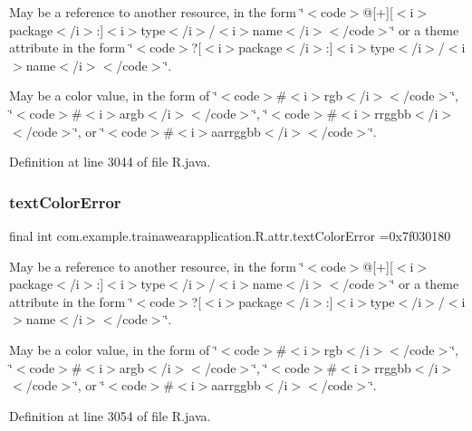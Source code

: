 May be a reference to another resource, in the form \char`\"{}$<$code$>$@\mbox{[}+\mbox{]}\mbox{[}$<$i$>$package$<$/i$>$\+:\mbox{]}$<$i$>$type$<$/i$>$/$<$i$>$name$<$/i$>$$<$/code$>$\char`\"{} or a theme attribute in the form \char`\"{}$<$code$>$?\mbox{[}$<$i$>$package$<$/i$>$\+:\mbox{]}$<$i$>$type$<$/i$>$/$<$i$>$name$<$/i$>$$<$/code$>$\char`\"{}. 

May be a color value, in the form of \char`\"{}$<$code$>$\#$<$i$>$rgb$<$/i$>$$<$/code$>$\char`\"{}, \char`\"{}$<$code$>$\#$<$i$>$argb$<$/i$>$$<$/code$>$\char`\"{}, \char`\"{}$<$code$>$\#$<$i$>$rrggbb$<$/i$>$$<$/code$>$\char`\"{}, or \char`\"{}$<$code$>$\#$<$i$>$aarrggbb$<$/i$>$$<$/code$>$\char`\"{}. 

Definition at line 3044 of file R.\+java.

\mbox{\label{classcom_1_1example_1_1trainawearapplication_1_1_r_1_1attr_a24b1ff1d1704c18bb112244e16d1278a}} 
\subsubsection{\texorpdfstring{textColorError}{textColorError}}
{\footnotesize\ttfamily final int com.\+example.\+trainawearapplication.\+R.\+attr.\+text\+Color\+Error =0x7f030180\hspace{0.3cm}{\ttfamily [static]}}

May be a reference to another resource, in the form \char`\"{}$<$code$>$@\mbox{[}+\mbox{]}\mbox{[}$<$i$>$package$<$/i$>$\+:\mbox{]}$<$i$>$type$<$/i$>$/$<$i$>$name$<$/i$>$$<$/code$>$\char`\"{} or a theme attribute in the form \char`\"{}$<$code$>$?\mbox{[}$<$i$>$package$<$/i$>$\+:\mbox{]}$<$i$>$type$<$/i$>$/$<$i$>$name$<$/i$>$$<$/code$>$\char`\"{}. 

May be a color value, in the form of \char`\"{}$<$code$>$\#$<$i$>$rgb$<$/i$>$$<$/code$>$\char`\"{}, \char`\"{}$<$code$>$\#$<$i$>$argb$<$/i$>$$<$/code$>$\char`\"{}, \char`\"{}$<$code$>$\#$<$i$>$rrggbb$<$/i$>$$<$/code$>$\char`\"{}, or \char`\"{}$<$code$>$\#$<$i$>$aarrggbb$<$/i$>$$<$/code$>$\char`\"{}. 

Definition at line 3054 of file R.\+java.

\mbox{\label{classcom_1_1example_1_1trainawearapplication_1_1_r_1_1attr_a8902d087f22c961e9f6ce685b79fd546}} 
